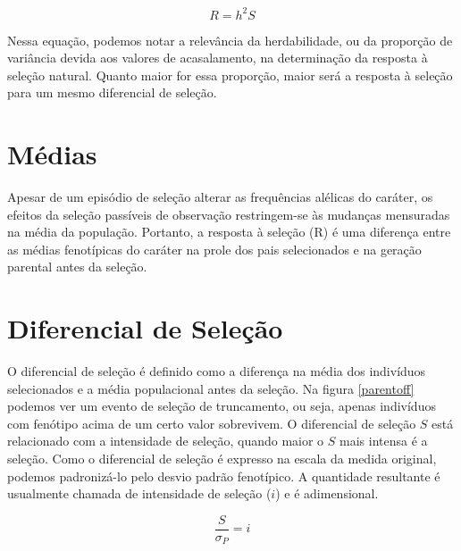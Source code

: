 \documentclass[portuges,]{tufte-handout}
\begin{document}
\[
R = h^2S
\]

Nessa equação, podemos notar a relevância da herdabilidade, ou da
proporção de variância devida aos valores de acasalamento, na
determinação da resposta à seleção natural. Quanto maior for essa
proporção, maior será a resposta à seleção para um mesmo diferencial de
seleção.

\section{Médias}\label{muxe9dias}

Apesar de um episódio de seleção alterar as frequências alélicas do
caráter, os efeitos da seleção passíveis de observação restringem-se às
mudanças mensuradas na média da população. Portanto, a resposta à
seleção (R) é uma diferença entre as médias fenotípicas do caráter na
prole dos pais selecionados e na geração parental antes da seleção.

\section{Diferencial de Seleção}\label{diferencial-de-seleuxe7uxe3o}

O diferencial de seleção é definido como a diferença na média dos
indivíduos selecionados e a média populacional antes da seleção. Na
figura \ref{parentoff} podemos ver um evento de seleção de truncamento,
ou seja, apenas indivíduos com fenótipo acima de um certo valor
sobrevivem. O diferencial de seleção \(S\) está relacionado com a
intensidade de seleção, quando maior o \(S\) mais intensa é a seleção.
Como o diferencial de seleção é expresso na escala da medida original,
podemos padronizá-lo pelo desvio padrão fenotípico. A quantidade
resultante é usualmente chamada de intensidade de seleção (\(i\)) e é
adimensional.

\[
\frac{S}{\sigma_P} = i
\]
\end{document}
